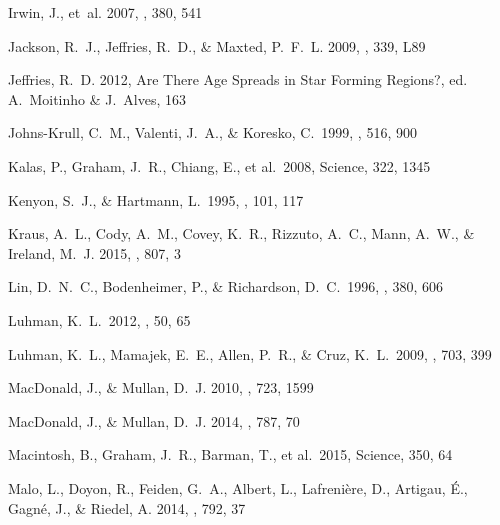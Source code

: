 \begin{thebibliography}{56}
Irwin, J., {et~al.} 2007, \mnras, 380, 541

{Jackson}, R.~J., {Jeffries}, R.~D., \& {Maxted}, P.~F.~L. 2009, \mnras, 339,
  L89

{Jeffries}, R.~D. 2012, {Are There Age Spreads in Star Forming Regions?}, ed.
  A.~{Moitinho} \& J.~{Alves}, 163
  
 Johns-Krull, C.~M., Valenti, J.~A., \& Koresko, C.\ 1999, \apj, 516, 900 

  
 Kalas, P., Graham, J.~R., 
Chiang, E., et al.\ 2008, Science, 322, 1345

 Kenyon, S.~J., \& Hartmann, L.\ 1995, \apjs, 101, 117

{Kraus}, A.~L., {Cody}, A.~M., {Covey}, K.~R., {Rizzuto}, A.~C., {Mann}, A.~W.,
  \& {Ireland}, M.~J. 2015, \apj, 807, 3
  
 Lin, D.~N.~C., Bodenheimer, P., \& Richardson, D.~C.\ 1996, \nat, 380, 606

 Luhman, K.~L.\ 2012, \araa, 50, 65

 Luhman, K.~L., Mamajek, E.~E., Allen, P.~R., \& Cruz, K.~L.\ 2009, \apj, 703, 399

MacDonald, J., \& Mullan, D.~J. 2010, \apj, 723, 1599

{MacDonald}, J., \& {Mullan}, D.~J. 2014, \apj, 787, 70

 Macintosh, B., Graham, J.~R., Barman, T., et al.\ 2015, Science, 350, 64

{Malo}, L., {Doyon}, R., {Feiden}, G.~A., {Albert}, L., {Lafreni{\`e}re}, D.,
  {Artigau}, {\'E}., {Gagn{\'e}}, J., \& {Riedel}, A. 2014, \apj, 792, 37


\end{thebibliography}
